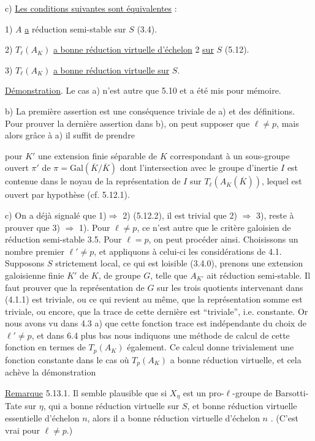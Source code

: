 c) \underline{Les conditions suivantes sont équivalentes} :

1) $A$ \underline{a} réduction semi-stable sur $S$ (3.4).

2) $T_\ell(A_K)$ \underline{a bonne réduction virtuelle d'échelon} 2 \underline{sur} $S$ (5.12).

3) $T_\ell(A_K)$ \underline{a bonne réduction virtuelle sur} $S$.

\underline{Démonstration}. Le cas a) n'est autre que 5.10 et a été mis pour mémoire.

b) La première assertion est une conséquence triviale de a) et des définitions. Pour prouver la dernière assertion dans b), on peut supposer que $\ell \neq p$, mais alors grâce à a) il suffit de prendre



pour $K'$ une extension finie séparable de $K$ correspondant à un sous-groupe ouvert $\pi'$ de $\pi = \mathrm{Gal}(\overline{K}/\overline{K})$ dont l'intersection avec le groupe d'inertie $I$ est contenue dans le noyau de la représentation de $I$ sur $T_\ell(A_K(\overline{K}))$, lequel est ouvert par hypothèse (cf. 5.12.1).

c) On a déjà signalé que 1)$\Longrightarrow$ 2) (5.12.2), il est trivial que 2) $\Longrightarrow$ 3), reste à prouver que 3) $\Longrightarrow$ 1). Pour $\ell \neq p$, ce n'est autre que le critère galoisien de réduction semi-stable 3.5. Pour $\ell = p$, on peut procéder ainsi. Choisissons un nombre premier $\ell' \neq p$, et appliquons à celui-ci les considérations de 4.1. Supposons $S$ strictement local, ce qui est loisible (3.4.0), prenons une extension galoisienne finie $K'$ de $K$, de groupe $G$, telle que $A_{K'}$ ait réduction semi-stable. Il faut prouver que la représentation de $G$ sur les trois quotients intervenant dans (4.1.1) est triviale, ou ce qui revient au même, que la représentation somme est triviale, ou encore, que la trace de cette dernière est ``triviale'', i.e. constante. Or nous avons vu dans 4.3 a) que cette fonction trace est indépendante du choix de $\ell' \neq p$, et dans 6.4 plus bas nous indiquons une méthode de calcul de cette fonction en termes de $T_p(A_K)$ également. Ce calcul donne trivialement une fonction constante dans le cas où $T_p(A_K)$ a bonne réduction virtuelle, et cela achève la démonstration

\underline{Remarque} 5.13.1. Il semble plausible que si $X_\eta$ est un pro-$\ell$-groupe de Barsotti-Tate sur $\eta$, qui a bonne réduction virtuelle sur $S$, et bonne réduction virtuelle essentielle d'échelon $n$, alors il a bonne réduction virtuelle d'échelon $n$ . (C'est vrai pour $\ell \neq p$.)


